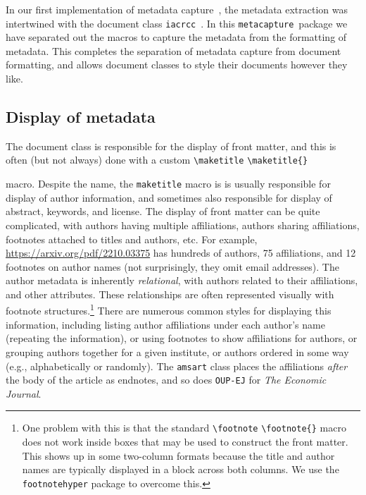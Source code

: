 \documentclass{article}
\newcommand{\pkgname}{\texttt{metacapture}}
\newcommand{\cmd}[2][]{%
  \def\FirstArg{#1}%
  \ifx\FirstArg\empty%
    \texttt{\textbackslash{}#2}%
  \else%
    \texttt{\textbackslash{}#2\{#1\}}%
  \fi
}
\newcommand{\pkg}[1]{\texttt{#1}}
\begin{document}
In our first implementation of metadata capture~\cite{tugboat}, the
metadata extraction was intertwined with the document
class \texttt{iacrcc}~\cite{iacrcc}. In this \pkgname\ package we have
separated out the macros to capture the metadata from the formatting
of metadata. This completes the separation of metadata capture from
document formatting, and allows document classes to style their documents
however they like.


\subsection{Display of metadata}\label{maketitle}
The document class is responsible for the display of front matter, and
this is often (but not always) done with a custom \cmd{maketitle}
macro. Despite the name, the  \texttt{maketitle} macro is is usually
responsible for display of author information, and sometimes also
responsible for display of abstract, keywords, and license. The
display of front matter can be quite complicated, with authors having
multiple affiliations, authors sharing affiliations, footnotes
attached to titles and authors, etc. For
example, \url{https://arxiv.org/pdf/2210.03375} has hundreds of
authors, 75 affiliations, and 12 footnotes on author names (not
surprisingly, they omit email addresses).  The author metadata is
inherently {\em relational}, with authors related to their
affiliations, and other attributes. These relationships are often
represented visually with footnote structures.\footnote{One problem
with this is that the standard
\cmd{footnote} macro does not work inside boxes that may be used to construct
the front matter. This shows up in some two-column formats because the
title and author names are typically displayed in a block across both columns.
We use the \texttt{footnotehyper} package to overcome this.}
There are numerous common styles
for displaying this information, including listing author affiliations
under each author's name (repeating the information), or using
footnotes to show affiliations for authors, or grouping authors
together for a given institute, or authors ordered in some way (e.g.,
alphabetically or randomly). The \pkg{amsart} class places the
affiliations {\em after} the body of the article as endnotes, and so
does \pkg{OUP-EJ} for \emph{The Economic Journal}.
\end{document}
